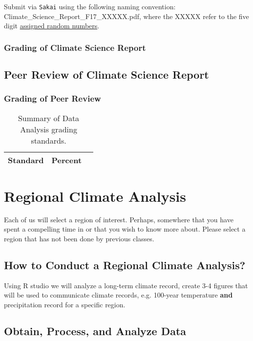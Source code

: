 \documentclass{article}\usepackage[]{graphicx}\usepackage[]{color}
\begin{document}
Submit via \texttt{Sakai} using the following naming convention: Climate\_Science\_Report\_F17\_XXXXX.pdf, where the XXXXX refer to the five digit \href{https://github.com/marclos/Climate_Change_Narratives/raw/master/Admin/RandomNumbers.pdf}{assigned random numbers}.

\subsubsection{Grading of Climate Science Report}


\subsection{Peer Review of Climate Science Report}

\subsubsection{Grading of Peer Review}


\begin{table}[h]
\caption{Summary of Data Analysis grading standards.}
\label{tab:litreviewgrading}
\begin{tabular}{lll}\hline
Standard      &   Percent   & \\ \hline\hline
\hline
\end{tabular}
\end{table}



\section{Regional Climate Analysis}

Each of us will select a region of interest. Perhaps, somewhere that you have spent a compelling time in or that you wish to know more about. Please select a region that has not been done by previous classes. 

\subsection{How to Conduct a Regional Climate Analysis?}

Using R studio we will analyze a long-term climate record, create 3-4 figures that will be used to communicate climate records, e.g. 100-year temperature \textbf{and} precipitation record for a specific region. 

\subsection{Obtain, Process, and Analyze Data}
\end{document}
